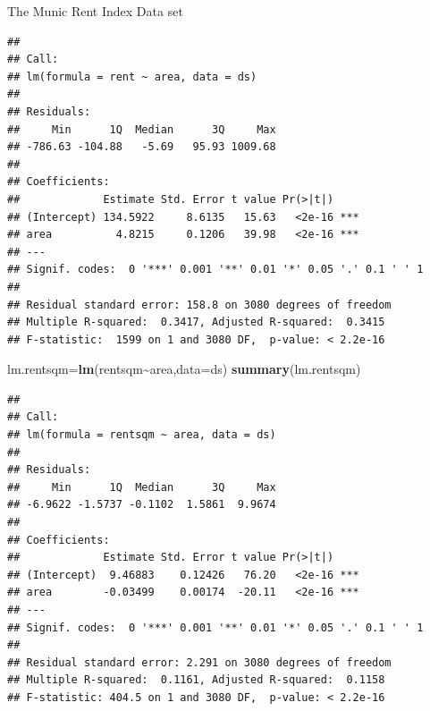\documentclass[
  ignorenonframetext,
]{beamer}
\newenvironment{Shaded}{\begin{snugshade}}{\end{snugshade}}
\newcommand{\AttributeTok}[1]{\textcolor[rgb]{0.13,0.29,0.53}{#1}}
\newcommand{\FunctionTok}[1]{\textcolor[rgb]{0.13,0.29,0.53}{\textbf{#1}}}
\newcommand{\NormalTok}[1]{#1}
\newcommand{\OtherTok}[1]{\textcolor[rgb]{0.56,0.35,0.01}{#1}}
\newcommand{\SpecialCharTok}[1]{\textcolor[rgb]{0.81,0.36,0.00}{\textbf{#1}}}
\begin{document}
\begin{frame}[fragile]
\begin{block}{The Munic Rent Index Data set}
\begin{verbatim}
## 
## Call:
## lm(formula = rent ~ area, data = ds)
## 
## Residuals:
##     Min      1Q  Median      3Q     Max 
## -786.63 -104.88   -5.69   95.93 1009.68 
## 
## Coefficients:
##             Estimate Std. Error t value Pr(>|t|)    
## (Intercept) 134.5922     8.6135   15.63   <2e-16 ***
## area          4.8215     0.1206   39.98   <2e-16 ***
## ---
## Signif. codes:  0 '***' 0.001 '**' 0.01 '*' 0.05 '.' 0.1 ' ' 1
## 
## Residual standard error: 158.8 on 3080 degrees of freedom
## Multiple R-squared:  0.3417, Adjusted R-squared:  0.3415 
## F-statistic:  1599 on 1 and 3080 DF,  p-value: < 2.2e-16
\end{verbatim}

\begin{Shaded}
\begin{Highlighting}[]
\NormalTok{lm.rentsqm}\OtherTok{=}\FunctionTok{lm}\NormalTok{(rentsqm}\SpecialCharTok{\textasciitilde{}}\NormalTok{area,}\AttributeTok{data=}\NormalTok{ds)}
\FunctionTok{summary}\NormalTok{(lm.rentsqm)}
\end{Highlighting}
\end{Shaded}

\begin{verbatim}
## 
## Call:
## lm(formula = rentsqm ~ area, data = ds)
## 
## Residuals:
##     Min      1Q  Median      3Q     Max 
## -6.9622 -1.5737 -0.1102  1.5861  9.9674 
## 
## Coefficients:
##             Estimate Std. Error t value Pr(>|t|)    
## (Intercept)  9.46883    0.12426   76.20   <2e-16 ***
## area        -0.03499    0.00174  -20.11   <2e-16 ***
## ---
## Signif. codes:  0 '***' 0.001 '**' 0.01 '*' 0.05 '.' 0.1 ' ' 1
## 
## Residual standard error: 2.291 on 3080 degrees of freedom
## Multiple R-squared:  0.1161, Adjusted R-squared:  0.1158 
## F-statistic: 404.5 on 1 and 3080 DF,  p-value: < 2.2e-16
\end{verbatim}


\end{block}
\end{frame}
\end{document}
